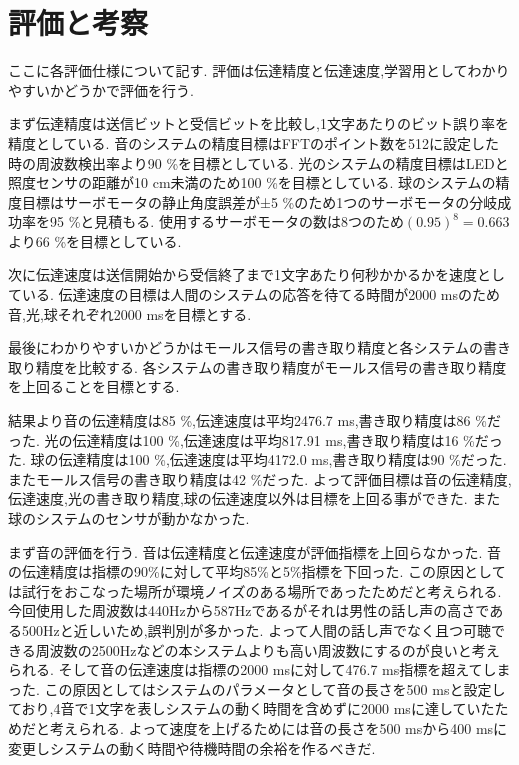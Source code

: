 \section{評価と考察}

ここに各評価仕様について記す.
評価は伝達精度と伝達速度,学習用としてわかりやすいかどうかで評価を行う.


まず伝達精度は送信ビットと受信ビットを比較し,1文字あたりのビット誤り率を精度としている.
音のシステムの精度目標はFFTのポイント数を512に設定した時の周波数検出率より90 \%を目標としている\cite{otoken}.
光のシステムの精度目標はLEDと照度センサの距離が10 cm未満のため100 \%を目標としている\cite{hitensou}.
球のシステムの精度目標はサーボモータの静止角度誤差が±5 \%のため1つのサーボモータの分岐成功率を95 \%と見積もる\cite{seisi}.
使用するサーボモータの数は8つのため$(0.95)^8 = 0.663$より66 \%を目標としている.

次に伝達速度は送信開始から受信終了まで1文字あたり何秒かかるかを速度としている.
伝達速度の目標は人間のシステムの応答を待てる時間が2000 msのため音,光,球それぞれ2000 msを目標とする\cite{outou}.

最後にわかりやすいかどうかはモールス信号の書き取り精度と各システムの書き取り精度を比較する.
各システムの書き取り精度がモールス信号の書き取り精度を上回ることを目標とする.


結果より音の伝達精度は85 \%,伝達速度は平均2476.7 ms,書き取り精度は86 \%だった.
光の伝達精度は100 \%,伝達速度は平均817.91 ms,書き取り精度は16 \%だった.
球の伝達精度は100 \%,伝達速度は平均4172.0 ms,書き取り精度は90 \%だった.
またモールス信号の書き取り精度は42 \%だった.
よって評価目標は音の伝達精度,伝達速度,光の書き取り精度,球の伝達速度以外は目標を上回る事ができた.
また球のシステムのセンサが動かなかった.


まず音の評価を行う.
音は伝達精度と伝達速度が評価指標を上回らなかった.
音の伝達精度は指標の90\%に対して平均85\%と5\%指標を下回った.
この原因としては試行をおこなった場所が環境ノイズのある場所であったためだと考えられる.
今回使用した周波数は440Hzから587Hzであるがそれは男性の話し声の高さである500Hzと近しいため,誤判別が多かった\cite{koe}.
よって人間の話し声でなく且つ可聴できる周波数の2500Hzなどの本システムよりも高い周波数にするのが良いと考えられる.
そして音の伝達速度は指標の2000 msに対して476.7 ms指標を超えてしまった.
この原因としてはシステムのパラメータとして音の長さを500 msと設定しており,4音で1文字を表しシステムの動く時間を含めずに2000 msに達していたためだと考えられる.
よって速度を上げるためには音の長さを500 msから400 msに変更しシステムの動く時間や待機時間の余裕を作るべきだ.


